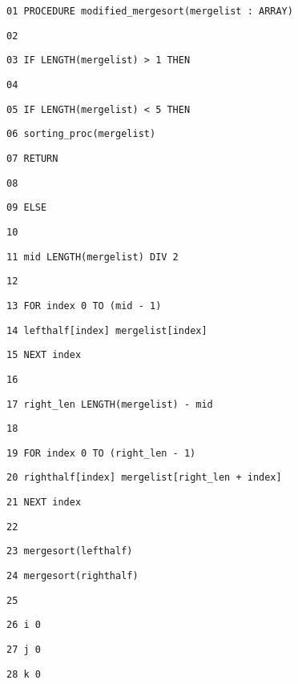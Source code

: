 \noindent %
\noindent\begin{minipage}[t]{1\columnwidth}%
\texttt{01 PROCEDURE modified\_mergesort(mergelist : ARRAY) }

\texttt{02 }

\texttt{03 \qquad{}IF LENGTH(mergelist) > 1 THEN }

\texttt{04 }

\texttt{05 \qquad{}\qquad{}IF LENGTH(mergelist) < 5 THEN }

\texttt{06 \qquad{}\qquad{}\qquad{}sorting\_proc(mergelist) }

\texttt{07 \qquad{}\qquad{}\qquad{}RETURN}

\texttt{08 }

\texttt{09 \qquad{}\qquad{}ELSE}

\texttt{10}

\texttt{11 \qquad{}\qquad{}\qquad{}mid \textleftarrow{} LENGTH(mergelist)
DIV 2 }

\texttt{12 }

\texttt{13 \qquad{}\qquad{}\qquad{}FOR index \textleftarrow{} 0
TO (mid - 1) }

\texttt{14 \qquad{}\qquad{}\qquad{}\qquad{}lefthalf{[}index{]}
\textleftarrow{} mergelist{[}index{]} }

\texttt{15 \qquad{}\qquad{}\qquad{}NEXT index}

\texttt{16}

\texttt{17 \qquad{}\qquad{}\qquad{}right\_len \textleftarrow{}
LENGTH(mergelist) - mid }

\texttt{18}

\texttt{19 \qquad{}\qquad{}\qquad{}FOR index \textleftarrow{} 0
TO (right\_len - 1) }

\texttt{20 \qquad{}\qquad{}\qquad{}\qquad{}righthalf{[}index{]}
\textleftarrow{} mergelist{[}right\_len + index{]} }

\texttt{21 \qquad{}\qquad{}\qquad{}NEXT index }

\texttt{22}

\texttt{23 \qquad{}\qquad{}\qquad{}mergesort(lefthalf) }

\texttt{24 \qquad{}\qquad{}\qquad{}mergesort(righthalf) }

\texttt{25}

\texttt{26 \qquad{}\qquad{}\qquad{}i \textleftarrow{} 0 }

\texttt{27 \qquad{}\qquad{}\qquad{}j \textleftarrow{} 0 }

\texttt{28 \qquad{}\qquad{}\qquad{}k \textleftarrow{} 0 }


\end{minipage}
